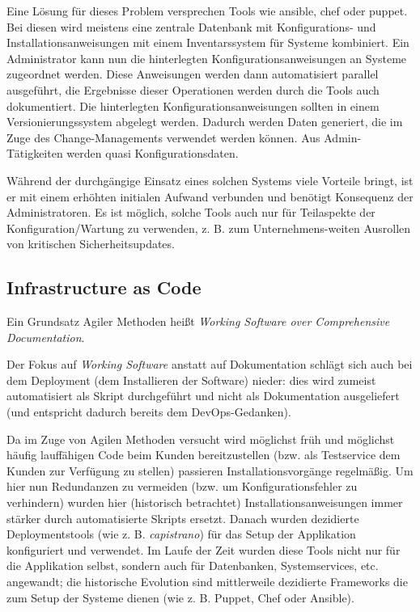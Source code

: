 Eine Lösung für dieses Problem versprechen Tools wie ansible, chef oder puppet. Bei diesen wird meistens eine zentrale Datenbank mit Konfigurations- und Installationsanweisungen mit einem Inventarssystem für Systeme kombiniert. Ein Administrator kann nun die hinterlegten Konfigurationsanweisungen an Systeme zugeordnet werden. Diese Anweisungen werden dann automatisiert parallel ausgeführt, die Ergebnisse dieser Operationen werden durch die Tools auch dokumentiert. Die hinterlegten Konfigurationsanweisungen sollten in einem Versionierungssystem abgelegt werden. Dadurch werden Daten generiert, die im Zuge des Change-Managements verwendet werden können. Aus Admin-Tätigkeiten werden quasi Konfigurationsdaten.

Während der durchgängige Einsatz eines solchen Systems viele Vorteile bringt, ist er mit einem erhöhten initialen Aufwand verbunden und benötigt Konsequenz der Administratoren. Es ist möglich, solche Tools auch nur für Teilaspekte der Konfiguration/Wartung zu verwenden, z. B. zum Unternehmens-weiten Ausrollen von kritischen Sicherheitsupdates.

\subsection{Infrastructure as Code}

Ein Grundsatz Agiler Methoden heißt \textit{Working Software over Comprehensive Documentation}.

Der Fokus auf \textit{Working Software} anstatt auf Dokumentation schlägt sich auch bei dem Deployment (dem Installieren der Software) nieder: dies wird zumeist automatisiert als Skript durchgeführt und nicht als Dokumentation ausgeliefert (und entspricht dadurch bereits dem DevOps-Gedanken).

Da im Zuge von Agilen Methoden versucht wird möglichst früh und möglichst häufig lauffähigen Code beim Kunden bereitzustellen (bzw. als Testservice dem Kunden zur Verfügung zu stellen) passieren Installationsvorgänge regelmäßig. Um hier nun Redundanzen zu vermeiden (bzw. um Konfigurationsfehler zu verhindern) wurden hier (historisch betrachtet) Installationsanweisungen immer stärker durch automatisierte Skripts ersetzt. Danach wurden dezidierte Deploymentstools (wie z. B. \textit{capistrano}) für das Setup der Applikation konfiguriert und verwendet. Im Laufe der Zeit wurden diese Tools nicht nur für die Applikation selbst, sondern auch für Datenbanken, Systemservices, etc. angewandt; die historische Evolution sind mittlerweile dezidierte Frameworks die zum Setup der Systeme dienen (wie z. B. Puppet, Chef oder Ansible).

